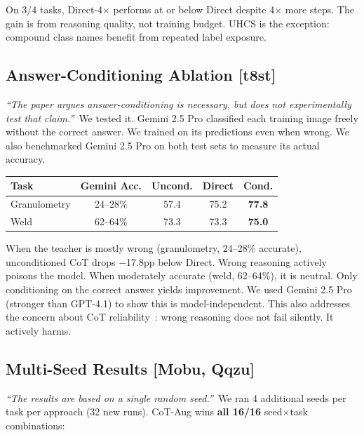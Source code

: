 \documentclass[10pt,twocolumn,letterpaper]{article}
\begin{document}
On 3/4 tasks, Direct-4$\times$ performs at or below Direct despite 4$\times$ more steps. The gain is from reasoning quality, not training budget. UHCS is the exception: compound class names benefit from repeated label exposure.

\subsection{Answer-Conditioning Ablation [t8st]}
\label{sec:uncond}

\textit{``The paper argues answer-conditioning is necessary, but does not experimentally test that claim.''}~We tested it. Gemini 2.5 Pro classified each training image freely without the correct answer. We trained on its predictions even when wrong. We also benchmarked Gemini 2.5 Pro on both test sets to measure its actual accuracy.

\vspace{-2pt}
\begin{table}[h]
\centering\small
\setlength{\tabcolsep}{3.5pt}
\begin{tabular}{lcccc}
\toprule
Task & Gemini Acc. & Uncond. & Direct & Cond. \\
\midrule
Granulometry & 24--28\% & 57.4 & 75.2 & \textbf{77.8} \\
Weld & 62--64\% & 73.3 & 73.3 & \textbf{75.0} \\
\bottomrule
\end{tabular}
\vspace{-6pt}
\end{table}

When the teacher is mostly wrong (granulometry, 24--28\% accurate), unconditioned CoT drops $-$17.8pp below Direct. Wrong reasoning actively poisons the model. When moderately accurate (weld, 62--64\%), it is neutral. Only conditioning on the correct answer yields improvement. We used Gemini 2.5 Pro (stronger than GPT-4.1) to show this is model-independent. This also addresses the concern about CoT reliability~\cite{xia2025bootstrapping}: wrong reasoning does not fail silently. It actively harms.

\subsection{Multi-Seed Results [Mobu, Qqzu]}
\label{sec:seeds}

\textit{``The results are based on a single random seed.''}~We ran 4 additional seeds per task per approach (32 new runs). CoT-Aug wins \textbf{all 16/16} seed$\times$task combinations:
\end{document}
